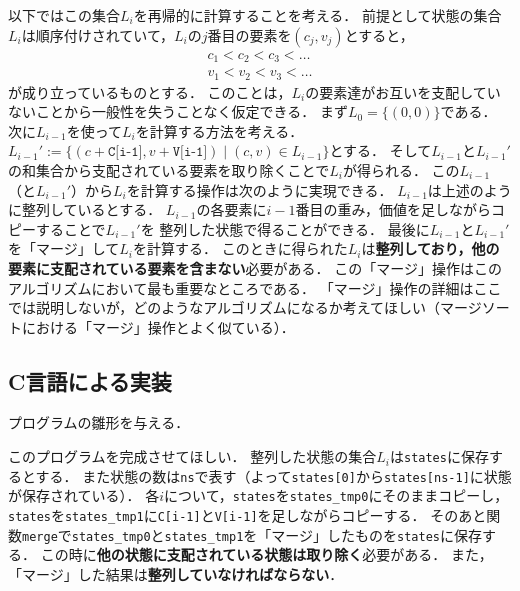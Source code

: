 \documentclass[a4paper,twoside,onecolumn,openany,article]{memoir}
\theoremstyle{remark}
\begin{document}
以下ではこの集合$L_i$を再帰的に計算することを考える．
前提として状態の集合$L_i$は順序付けされていて，$L_i$の$j$番目の要素を$(c_j, v_j)$とすると，
\begin{align*}
c_1< c_2< c_3< \dotsc\\
v_1< v_2< v_3< \dotsc
\end{align*}
が成り立っているものとする．
このことは，$L_i$の要素達がお互いを支配していないことから一般性を失うことなく仮定できる．
まず$L_0=\{(0,0)\}$である．
次に$L_{i-1}$を使って$L_i$を計算する方法を考える．
$L_{i-1}':=\{(c+\texttt{C[i-1]}, v+\texttt{V[i-1]})\mid (c,v)\in L_{i-1}\}$とする．
そして$L_{i-1}$と$L_{i-1}'$の和集合から支配されている要素を取り除くことで$L_i$が得られる．
この$L_{i-1}$（と$L_{i-1}'$）から$L_i$を計算する操作は次のように実現できる．
$L_{i-1}$は上述のように整列しているとする．
$L_{i-1}$の各要素に$i-1$番目の重み，価値を足しながらコピーすることで$L_{i-1}'$を
整列した状態で得ることができる．
最後に$L_{i-1}$と$L_{i-1}'$を「マージ」して$L_i$を計算する．
このときに得られた$L_i$は\textbf{整列しており，他の要素に支配されている要素を含まない}必要がある．
この「マージ」操作はこのアルゴリズムにおいて最も重要なところである．
「マージ」操作の詳細はここでは説明しないが，どのようなアルゴリズムになるか考えてほしい（マージソートにおける「マージ」操作とよく似ている）．

\subsection{C言語による実装}
プログラムの雛形を与える．

このプログラムを完成させてほしい．
整列した状態の集合$L_i$は\texttt{states}に保存するとする．
また状態の数は\texttt{ns}で表す（よって\texttt{states[0]}から\texttt{states[ns-1]}に状態が保存されている）．
各$i$について，\texttt{states}を\texttt{states\_tmp0}にそのままコピーし，
\texttt{states}を\texttt{states\_tmp1}に\texttt{C[i-1]}と\texttt{V[i-1]}を足しながらコピーする．
そのあと関数\texttt{merge}で\texttt{states\_tmp0}と\texttt{states\_tmp1}を「マージ」したものを\texttt{states}に保存する．
この時に\textbf{他の状態に支配されている状態は取り除く}必要がある．
また，「マージ」した結果は\textbf{整列していなければならない}．
\end{document}
